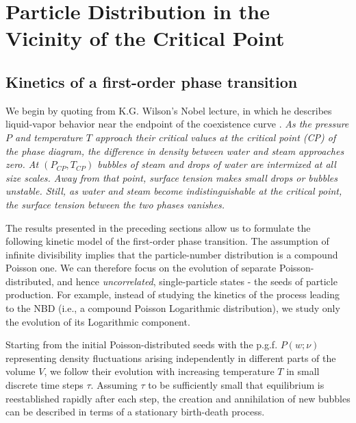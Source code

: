 \documentclass[a4paper,12pt]{amsart}
\theoremstyle{definition}
\theoremstyle{remark}
\begin{document}
\newpage
\section{Particle Distribution in the Vicinity of the Critical Point}\label{CPsec}
\subsection{Kinetics of a first-order phase transition}
We begin by quoting from K.G. Wilson's Nobel lecture, in which he describes liquid-vapor behavior near the endpoint of the coexistence curve \cite{Wilson:1983xri}. 
{\it  As  the pressure $P$ and temperature $T$  approach their critical values at the critical point (CP) 
of the phase diagram, the difference in density between water and steam approaches zero. 
At  $(P_{CP}, T_{CP})$ bubbles of steam and drops of water are intermixed at all size scales.    
Away from that point, surface tension makes small drops or bubbles unstable. Still, as water and steam become indistinguishable at the critical point, the surface tension between the two phases vanishes. 
}

The results presented in the preceding sections allow us to formulate the following kinetic model of the first-order phase transition. The assumption of infinite divisibility implies that the particle-number distribution is a compound Poisson one. We can therefore focus on the evolution of separate Poisson-distributed, and hence {\it uncorrelated}, single-particle states - the seeds of particle production. For example, instead of studying the kinetics of the process leading to the NBD (i.e., a compound Poisson Logarithmic distribution), we study only the evolution of its Logarithmic component. 

Starting from the initial Poisson-distributed seeds with the p.g.f. $P(w;\nu)$ representing density fluctuations arising independently in different parts of the volume $V$, we follow their evolution with increasing temperature $T$ in small discrete time steps $\tau$. Assuming $\tau$ to be sufficiently small that equilibrium is reestablished rapidly after each step, the creation and annihilation of new bubbles can be described in terms of a stationary birth-death process. 
\end{document}
